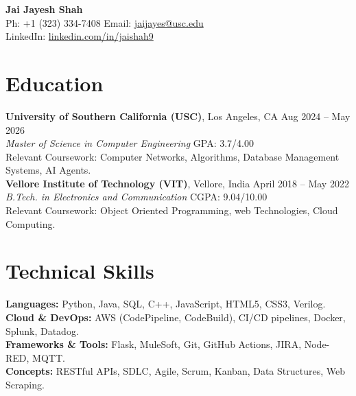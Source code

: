 \documentclass[letterpaper,10pt]{article}
\begin{document}
\begin{center}
    {\LARGE \textbf{Jai Jayesh Shah}} \\
    \vspace{2pt}
    \small
    Ph: +1 (323) 334-7408 \quad Email: \href{mailto:jaijayes@usc.edu}{jaijayes@usc.edu} \\
    LinkedIn: \href{https://www.linkedin.com/in/jaishah9}{linkedin.com/in/jaishah9} \\
    \vspace{-8pt}
\end{center}

\section*{Education}
\textbf{University of Southern California (USC)}, Los Angeles, CA \hfill Aug 2024 -- May 2026 \\
\textit{Master of Science in Computer Engineering} \hfill GPA: 3.7/4.00 \\
Relevant Coursework: Computer Networks, Algorithms, Database Management Systems, AI Agents. \\
\vspace{2pt}
\textbf{Vellore Institute of Technology (VIT)}, Vellore, India \hfill April 2018 -- May 2022 \\
\textit{B.Tech. in Electronics and Communication} \hfill CGPA: 9.04/10.00 \\
Relevant Coursework: Object Oriented Programming, web Technologies, Cloud Computing.

\section*{Technical Skills}
\textbf{Languages:} Python, Java, SQL, C++, JavaScript, HTML5, CSS3, Verilog. \\
\textbf{Cloud \& DevOps:} AWS (CodePipeline, CodeBuild), CI/CD pipelines, Docker, Splunk, Datadog. \\
\textbf{Frameworks \& Tools:} Flask, MuleSoft, Git, GitHub Actions, JIRA, Node-RED, MQTT. \\
\textbf{Concepts:} RESTful APIs, SDLC, Agile, Scrum, Kanban, Data Structures, Web Scraping.

\end{document}
